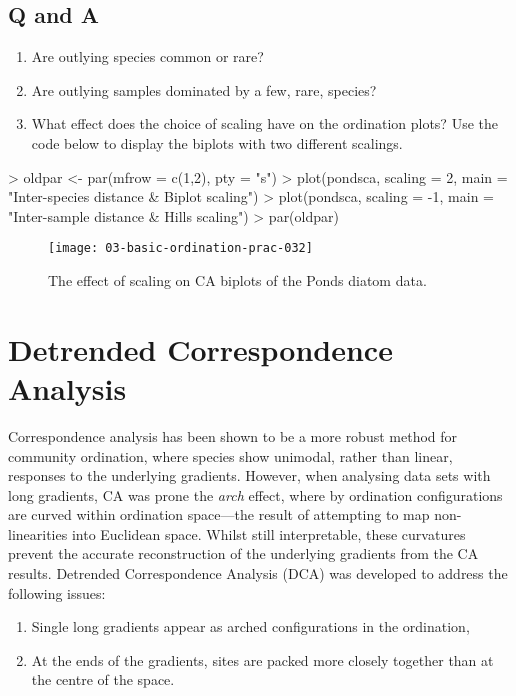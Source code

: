 \documentclass[a4paper,10pt]{article}
\begin{document}
{\subsection*{Q and A}
\begin{enumerate}
\item Are outlying species common or rare?
\item Are outlying samples dominated by a few, rare, species?
\item What effect does the choice of scaling have on the ordination plots? Use the code below to display the biplots with two different scalings.
\end{enumerate}

\begin{Schunk}
\begin{Sinput}
> oldpar <- par(mfrow = c(1,2), pty = "s")
> plot(pondsca, scaling = 2, main = "Inter-species distance & Biplot scaling")
> plot(pondsca, scaling = -1, main = "Inter-sample distance & Hills scaling")
> par(oldpar)
\end{Sinput}
\end{Schunk}
\begin{figure}[t]
\begin{center}
\texttt{[image: 03-basic-ordination-prac-032]}
\caption{\label{ca_comparison}The effect of scaling on CA biplots of the Ponds diatom data.}
\end{center}
\end{figure}

\section{Detrended Correspondence Analysis}
Correspondence analysis has been shown to be a more robust method for community ordination, where species show unimodal, rather than linear, responses to the underlying gradients. However, when analysing data sets with long gradients, CA was prone the \emph{arch} effect, where by ordination configurations are curved within ordination space---the result of attempting to map non-linearities into Euclidean space. Whilst still interpretable, these curvatures prevent the accurate reconstruction of the underlying gradients from the CA results. Detrended Correspondence Analysis (DCA) was developed to address the following issues:

\begin{enumerate}
\item Single long gradients appear as arched configurations in the ordination,
\item At the ends of the gradients, sites are packed more closely together than at the centre of the space.
\end{enumerate}

}
\end{document}
